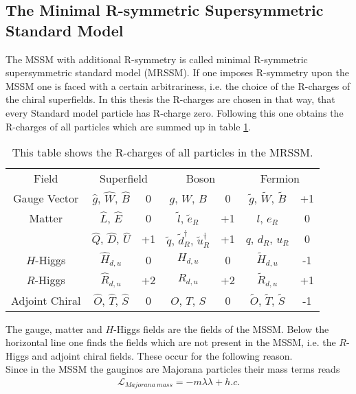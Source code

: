 \subsection{The Minimal R-symmetric Supersymmetric Standard Model}
The MSSM with additional R-symmetry is called minimal R-symmetric supersymmetric standard model (MRSSM).
If one imposes R-symmetry upon the MSSM one is faced with a certain arbitrariness, i.e. the choice of the R-charges of the chiral superfields. In this thesis the R-charges are chosen in that way, that every Standard model particle has R-charge zero. Following this one obtains the R-charges of all particles which are summed up in table \ref{tab:R_charges_MRSSM}. 
\begin{table}
\begin{center}
\begin{tabular}{c||c|c||c|c||c|c}
Field & \multicolumn{2}{c||}{Superfield} & \multicolumn{2}{c||}{Boson} & \multicolumn{2}{c}{Fermion} \\
\hhline{=#=|=#=|=#=|=}
Gauge Vector & $\hat{g}$, $\hat{W}$, $\hat{B}$ & 0 & $g$, $W$, $B$ & 0 & $\tilde{g}$, $\tilde{W}$, $\tilde{B}$ &+1\\
Matter & $\hat{L}$, $\hat{E}$ & 0 & $\tilde{l}$, $\tilde{e}_R$ & +1 & $l$, $e_R$ & 0\\
 & $\hat{Q}$, $\hat{D}$, $\hat{U}$ & +1 & $\tilde{q}$, $\tilde{d}^\dagger_R$, $\tilde{u}^\dagger_R$ & +1 & $q$, $d_R$, $u_R$ & 0\\
$H$-Higgs & $\hat{H}_{d,u}$ & 0 & $H_{d,u}$ & 0 & $\tilde{H}_{d,u}$ & -1\\
\hline
$R$-Higgs & $\hat{R}_{d,u}$ & +2 & $R_{d,u}$ & +2 & $\tilde{R}_{d,u}$ & +1\\
Adjoint Chiral & $\hat{O}$, $\hat{T}$, $\hat{S}$ & 0 & $O$, $T$, $S$ & 0 & $\tilde{O}$, $\tilde{T}$, $\tilde{S}$ & -1
\end{tabular}
\caption{This table shows the R-charges of all particles in the MRSSM.}\label{tab:R_charges_MRSSM}
\end{center}
\end{table}
The gauge, matter and $H$-Higgs fields are the fields of the MSSM. Below the horizontal line one finds the fields which are not present in the MSSM, i.e. the $R$-Higgs and adjoint chiral fields. These occur for the following reason.\\
Since in the MSSM the gauginos are Majorana particles their mass terms reads 
\begin{align}
\mathcal{L}_{Majorana\ mass} = -m\lambda\lambda + h.c.
\end{align}
